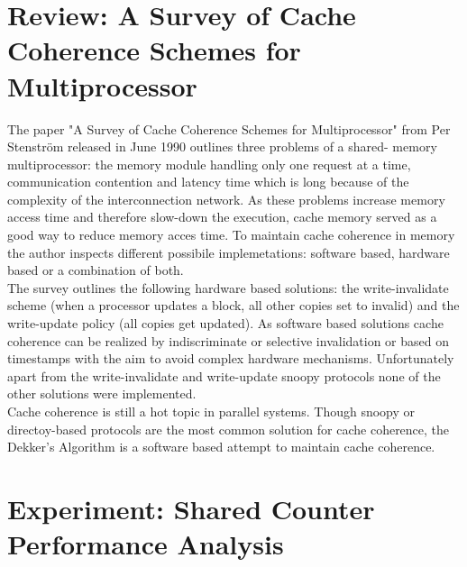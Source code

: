 \documentclass[DIV=12,oneside,a4paper]{scrartcl}
\begin{document}
\section{Review: A Survey of Cache Coherence Schemes for Multiprocessor}
The paper "A Survey of Cache Coherence Schemes for Multiprocessor" from
Per Stenström released in June 1990 outlines three problems of a shared-
memory multiprocessor: the memory module handling only one request at 
a time, communication contention and latency time which is long because 
of the complexity of the interconnection network. As these problems 
increase memory access time and therefore slow-down the execution, cache 
memory served as a good way to reduce memory acces time. To maintain 
cache coherence in memory the author inspects different possibile 
implemetations: software based, hardware based or a combination of both.
\\
The survey outlines the following hardware based solutions: the 
write-invalidate scheme (when a processor updates a block, all other 
copies set to invalid) and the write-update policy (all copies get updated). 
As software based solutions cache coherence can be realized by indiscriminate 
or selective invalidation or based on timestamps with the aim to avoid 
complex hardware mechanisms. Unfortunately apart from the write-invalidate 
and write-update snoopy protocols none of the other solutions were 
implemented. 
\\
Cache coherence is still a hot topic in parallel systems. Though snoopy
or directoy-based protocols are the most common solution for cache coherence, 
the Dekker's Algorithm is a software based attempt to maintain cache coherence.
    

\section{Experiment: Shared Counter Performance Analysis}
\end{document}
